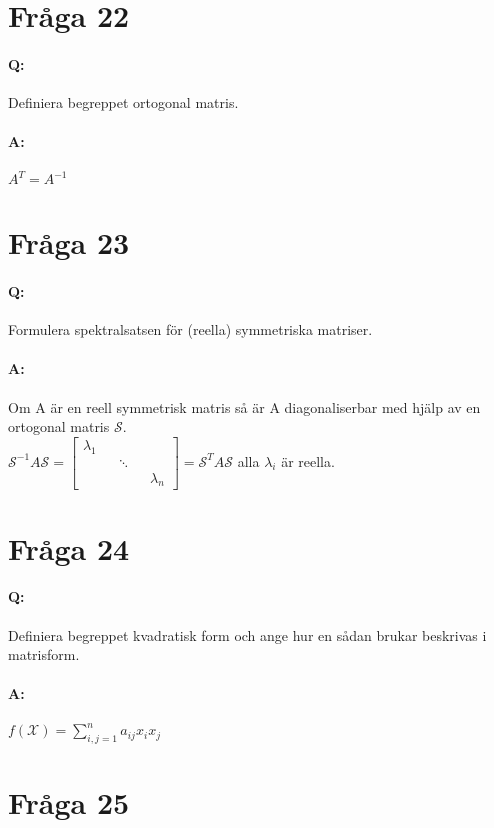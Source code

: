 \documentclass[a4paper]{article}
\begin{document}
\section{Fråga 22}
\paragraph{Q:} Definiera begreppet ortogonal matris. 
\paragraph{A:} $A^T=A^{-1}$

\section{Fråga 23}
\paragraph{Q:} Formulera spektralsatsen för (reella) symmetriska matriser.
\paragraph{A:} Om A är en reell symmetrisk matris så är A diagonaliserbar med hjälp av en ortogonal matris $\mathcal{S}$.\\
{ \center $\mathcal{S}^{-1}A\mathcal{S}=\begin{bmatrix} \lambda_1 && && \\ && \ddots && \\ && && \lambda_n \end{bmatrix} = \mathcal{S}^TA\mathcal{S}$ \endcenter } alla $\lambda_i$ är reella.

\section{Fråga 24}
\paragraph{Q:} Definiera begreppet kvadratisk form och ange hur en sådan brukar beskrivas i matrisform.
\paragraph{A:} $f(\mathcal{X})=\sum\limits_{i,j=1}^{n} a_{ij}x_ix_j$

\section{Fråga 25}
\end{document}
